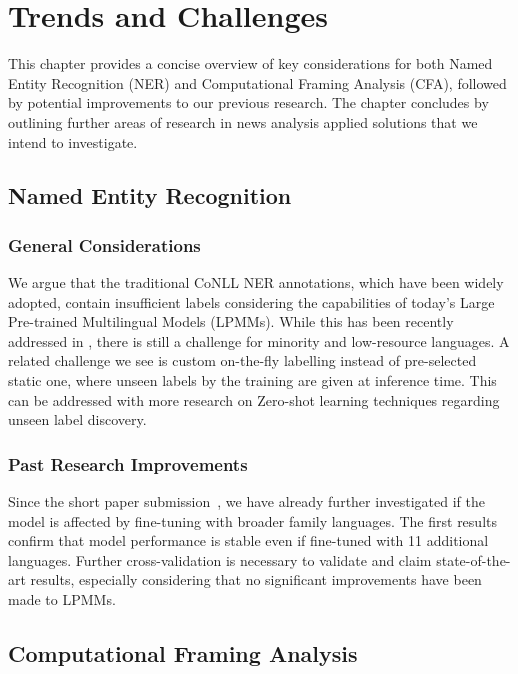 % 
\chapter{Trends and Challenges}
\label{ch:trends}
This chapter provides a concise overview of key considerations for both Named Entity Recognition (NER) and Computational Framing Analysis (CFA),
followed by potential improvements to our previous research.
The chapter concludes by outlining further areas of research in news analysis applied solutions that we intend to investigate.

\section{Named Entity Recognition}

\subsection{General Considerations}
We argue that the traditional CoNLL NER annotations, which have been widely adopted, contain insufficient labels considering the capabilities of today's Large Pre-trained Multilingual Models (LPMMs).
While this has been recently addressed in \textcite{malmasi-etal-2022-semeval}, there is still a challenge for minority and low-resource languages.
A related challenge we see is custom on-the-fly labelling instead of pre-selected static one, where unseen labels by the training are given at inference time. 
This can be addressed with more research on Zero-shot learning techniques regarding unseen label discovery.

\subsection{Past Research Improvements}
Since the short paper submission~\parencite{ivacic2023analysis}, we have already further investigated if the model is affected by fine-tuning with broader family languages.
The first results confirm that model performance is stable even if fine-tuned with 11 additional languages.
Further cross-validation is necessary to validate and claim state-of-the-art results, especially considering that no significant improvements have been made to LPMMs.

\section{Computational Framing Analysis}


